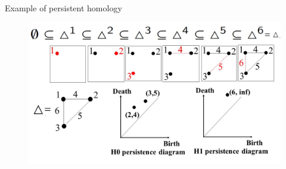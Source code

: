 \documentclass[xcolor={dvipsnames,svgnames}]{beamer}
\begin{document}
\begin{frame}{Example of persistent homology}
    \begin{figure}[H]
        \centering \includegraphics[width=\textwidth]{figures/persistence-eg.jpg}
    \end{figure}
\end{frame}

    
       
\end{document}
